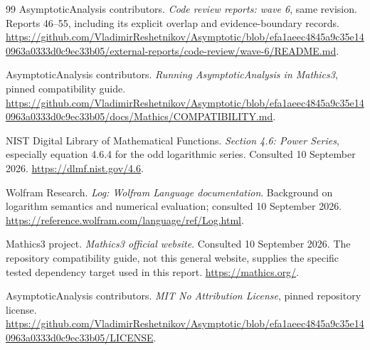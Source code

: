 \documentclass[11pt,letterpaper]{article}
\theoremstyle{remark}\newtheorem{remark}[proposition]{Remark}
\begin{document}
\begin{thebibliography}{99}
 AsymptoticAnalysis contributors.
\emph{Code review reports: wave 6}, same revision. Reports 46--55, including
its explicit overlap and evidence-boundary records.
\url{https://github.com/VladimirReshetnikov/Asymptotic/blob/efa1aeec4845a9c35e140963a0333d0c9ec33b05/external-reports/code-review/wave-6/README.md}.

 AsymptoticAnalysis contributors.
\emph{Running AsymptoticAnalysis in Mathics3}, pinned compatibility guide.
\url{https://github.com/VladimirReshetnikov/Asymptotic/blob/efa1aeec4845a9c35e140963a0333d0c9ec33b05/docs/Mathics/COMPATIBILITY.md}.

 NIST Digital Library of Mathematical Functions.
\emph{Section 4.6: Power Series}, especially equation 4.6.4 for the odd
logarithmic series. Consulted 10 September 2026.
\url{https://dlmf.nist.gov/4.6}.

 Wolfram Research.
\emph{Log: Wolfram Language documentation}. Background on logarithm
semantics and numerical evaluation; consulted 10 September 2026.
\url{https://reference.wolfram.com/language/ref/Log.html}.

 Mathics3 project.
\emph{Mathics3 official website}. Consulted 10 September 2026.
The repository compatibility guide, not this general website, supplies the
specific tested dependency target used in this report.
\url{https://mathics.org/}.

 AsymptoticAnalysis contributors.
\emph{MIT No Attribution License}, pinned repository license.
\url{https://github.com/VladimirReshetnikov/Asymptotic/blob/efa1aeec4845a9c35e140963a0333d0c9ec33b05/LICENSE}.
\end{thebibliography}
\end{document}
